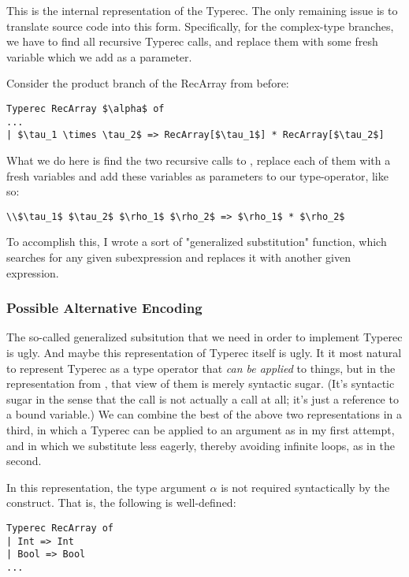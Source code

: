 \documentclass[pageno]{jpaper}
\begin{document}
{{{This is the internal representation of the Typerec. The only remaining issue is to translate source code
into this form. Specifically, for the complex-type branches, we have to find all recursive Typerec calls,
and replace them with some fresh variable which we add as a parameter.

Consider the product branch of the RecArray  from before:
\begin{lstlisting}[mathescape]
Typerec RecArray $\alpha$ of
...
| $\tau_1 \times \tau_2$ => RecArray[$\tau_1$] * RecArray[$\tau_2$]
\end{lstlisting}
What we do here is find the two recursive calls to , replace each of them with a fresh variables and add these variables as parameters to our type-operator, like so:
\begin{lstlisting}[mathescape]
\\$\tau_1$ $\tau_2$ $\rho_1$ $\rho_2$ => $\rho_1$ * $\rho_2$
\end{lstlisting}

To accomplish this, I wrote a sort of "generalized substitution" function, which searches for any given subexpression and replaces it with another given expression.

\subsubsection{Possible Alternative Encoding}
The so-called generalized subsitution that we need in order to implement Typerec is ugly.
And maybe this representation of Typerec itself is ugly. It it most natural to represent Typerec as a type operator
that \textit{can be applied} to things, but in the representation from \cite{harper-typecase}, that view of them is merely syntactic sugar. (It's syntactic sugar in the sense that the call  is not
actually a call at all; it's just a reference to a bound variable.)
We can combine the best of the above two representations in a third, in which a Typerec can be applied to
an argument as in my first attempt, and in which we substitute less eagerly, thereby avoiding infinite loops,
as in the second.

In this representation, the type argument $\alpha$ is not required syntactically by the construct.
That is, the following is well-defined:

\begin{lstlisting}[mathescape]
Typerec RecArray of
| Int => Int
| Bool => Bool
...
\end{lstlisting}

}}}
\end{document}
